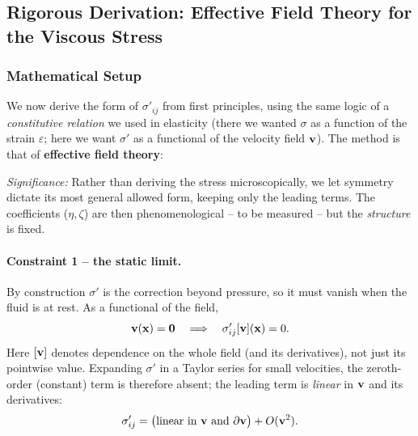 \documentclass[../main.tex]{subfiles}
\begin{document}

\subsection{Rigorous Derivation: Effective Field Theory for the Viscous Stress}\label{sec:lec18:eft}

\subsubsection*{Mathematical Setup}
We now derive the form of $\sigma'_{ij}$ from first principles, using the same logic of a \emph{constitutive relation} we used in elasticity (there we wanted $\sigma$ as a function of the strain $\varepsilon$; here we want $\sigma'$ as a functional of the velocity field $\mathbf{v}$). The method is that of \textbf{effective field theory}:

\textit{Significance:} Rather than deriving the stress microscopically, we let symmetry dictate its most general allowed form, keeping only the leading terms. The coefficients ($\eta,\zeta$) are then phenomenological -- to be measured -- but the \emph{structure} is fixed.

\paragraph{Constraint 1 -- the static limit.} By construction $\sigma'$ is the correction beyond pressure, so it must vanish when the fluid is at rest. As a functional of the field,
\begin{equation}
  \mathbf{v}(\mathbf{x})=\mathbf{0} \quad\Longrightarrow\quad \sigma'_{ij}[\mathbf{v}](\mathbf{x})=0 .
  \label{eq:lec18_static_limit}
\end{equation}
Here $[\mathbf{v}]$ denotes dependence on the whole field (and its derivatives), not just its pointwise value. Expanding $\sigma'$ in a Taylor series for small velocities, the zeroth-order (constant) term is therefore absent; the leading term is \emph{linear} in $\mathbf{v}$ and its derivatives:
\begin{equation}
  \sigma'_{ij} = \big(\text{linear in } \mathbf{v} \text{ and } \partial\mathbf{v}\big) + O(\mathbf{v}^2).
  \label{eq:lec18_taylor}
\end{equation}
\end{document}
